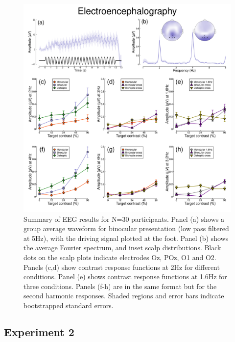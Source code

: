 \documentclass[
]{article}
\begin{document}
\begin{figure}

{\centering \includegraphics{Figures/EEGdata} 

}

\caption{Summary of EEG results for N=30 participants. Panel (a) shows a group average waveform for binocular presentation (low pass filtered at 5Hz), with the driving signal plotted at the foot. Panel (b) shows the average Fourier spectrum, and inset scalp distributions. Black dots on the scalp plots indicate electrodes Oz, POz, O1 and O2. Panels (c,d) show contrast response functions at 2Hz for different conditions. Panel (e) shows contrast response functions at 1.6Hz for three conditions. Panels (f-h) are in the same format but for the second harmonic responses. Shaded regions and error bars indicate bootstrapped standard errors.}\label{fig:EEGdata}
\end{figure}

\hypertarget{experiment-2-1}{%
\subsection{Experiment 2}\label{experiment-2-1}}
\end{document}
